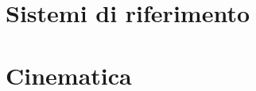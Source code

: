 \documentclass[a4paper, titlepage]{report}%
\theoremstyle{definition} %
\theoremstyle{plain}
\theoremstyle{plain}
\theoremstyle{remark}
\theoremstyle{remark}
\begin{document}
    
\section{Sistemi di riferimento}

    

\section{Cinematica}
    
    
\end{document}
